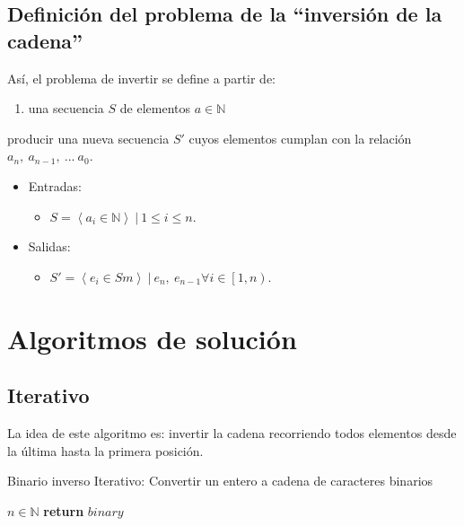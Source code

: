 \documentclass[letter]{article}
\begin{document}
\subsection{Definición del problema de la ``inversión de la cadena''} \label{problema}
Así, el problema de invertir se define a partir de:
  \begin{enumerate}
    \item una secuencia $S$ de elementos $a\in \mathbb{N}$
  \end{enumerate}
producir una nueva secuencia $S'$ cuyos elementos cumplan con la relación $a_n,~ a_{n-1},~ ...~ a_0$.
\begin{itemize}
    \item Entradas:
    \begin{itemize}
        \item $S = \left< a_i \in \mathbb{N} \right> ~ | ~ 1\le i \le n$.
    \end{itemize}
    \item Salidas:
    \begin{itemize}
        \item $S' = \left< e_i \in S m\right> ~ | ~ e_n,~ e_{n-1} \forall i \in \left[1,n\right)$.
    \end{itemize}
\end{itemize}

\section{Algoritmos de solución} \label{algoritmos}
\subsection{Iterativo}
\label{algoritmos:iterativo}
La idea de este algoritmo es: invertir la cadena recorriendo todos elementos desde la última hasta la primera posición.
\newpage

\begin{algorithm}[!htb]
\caption{Binario inverso Iterativo: Convertir un entero a cadena de caracteres binarios}
\begin{algorithmic}[1]
\Require $n \in \mathbb{N} $
  \EndWhile
  \State \textbf{return} $binary$
\EndProcedure
\end{algorithmic}
\end{algorithm}
\end{document}
